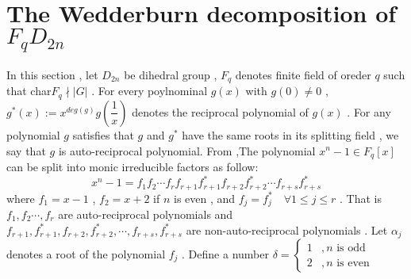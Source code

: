 \documentclass{article}
\begin{document}
\section{The Wedderburn decomposition of $F_qD_{2n}$}
In this section , let $D_{2n}$ be dihedral group , $F_q$ denotes finite field of oreder $q$ such that char$F_q$$\nmid$$\lvert G \rvert$ . For every poylnominal $g(x)$ with $g(0)\neq{0}$ , $g^{*}(x):=x^{deg(g)}g(\dfrac{1}{x})$ denotes the reciprocal polynomial of $g(x)$ . For any polynomial $g$ satisfies that $g$ and $g^{*}$ have the same roots in its splitting field , we say that $g$ is auto-reciprocal polynomial. From \cite{bib7},The polynomial $x^{n}-1\in{F_q[x]}$ can be split into monic irreducible factors as follow:
\begin{equation*}
   x^{n}-1=f_{1}f_{2}\cdots f_{r}f_{r+1}f_{r+1}^{*}f_{r+2}f_{r+2}^{*}\cdots f_{r+s}f_{r+s}^{*}
\end{equation*}
where $f_{1}=x-1$ , $f_{2}=x+2$ if $n$ is even , and $f_{j}=f_{j}^{*} \quad\forall 1\leq j\leq r$ . That is $f_{1},f_{2}\cdots,f_{r}$ are auto-reciprocal polynomials and $f_{r+1},f_{r+1}^{*},f_{r+2},f_{r+2}^{*},\cdots,f_{r+s},f_{r+s}^{*}$ are non-auto-reciprocal polynomials . Let $\alpha_j$ denotes a root of the polynomial $f_j$ . 
Define a number $
\delta = \left\{
\begin{array}{ll}
1 & ,\text{$n$ is odd }  \\
2 & ,\text{$n$ is even} 
\end{array}
\right.
$
\end{document}

